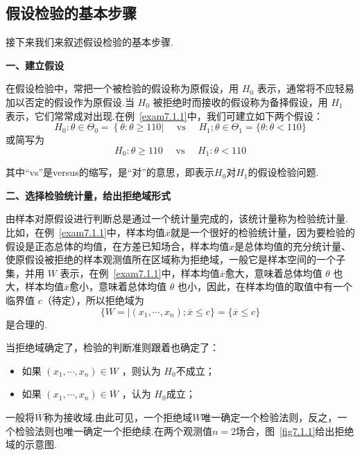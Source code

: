 \subsection{假设检验的基本步骤\label{7.1.2}}
接下来我们来叙述假设检验的基本步骤.

\textbf{一、建立假设}

在假设检验中，常把一个被检验的假设称为原假设，用 $H_{0}$ 表示，通常将不应轻易加以否定的假设作为原假设.当 $H_{0}$ 被拒绝时而接收的假设称为备择假设，用 $H_{1}$ 表示，它们常常成对出现.在例~\ref{exam7.1.1}中，我们可建立如下两个假设：
\[H _ { 0 } : \theta \in \Theta _ { 0 } = \left\{ \theta : \theta \geq 110 | \quad \text { vs } \quad H _ { 1 } ; \theta \in \Theta _ { 1 } = \{ \theta : \theta < 110 \}\right.\]
或简写为
\[H _ { 0 } : \theta \geq 110 \quad \text { vs } \quad H _ { 1 } : \theta < 110\]

其中“vs”是versus的缩写，是“对”的意思，即表示$H_{0}$对$H_{1}$的假设检验问题.

\textbf{二、选择检验统计量，给出拒绝域形式}

由样本对原假设进行判断总是通过一个统计量完成的，该统计量称为检验统计量.比如，在例~\ref{exam7.1.1}中，样本均值$\overline{x}$就是一个很好的检验统计量，因为要检验的假设是正态总体的均值，在方差已知场合，样本均值$x$是总体均值的充分统计量、使原假设被拒绝的样本观测值所在区域称为拒绝域，一般它是样本空间的一个子集，并用 $W$ 表示，在例~\ref{exam7.1.1}中，样本均值$\overline{x}$愈大，意味着总体均值 $\theta$ 也大，样本均值$\overline{x}$愈小，意味着总体均值 $\theta$ 也小，因此，在样本均值的取值中有一个临界值 $c$（待定），所以拒绝域为
\[\{W = | \left( x _ { 1 } , \cdots , x _ { n } \right) ; \overline { x } \leq c \} = \{ \overline { x } \leq c \}\]
是合理的.

当拒绝域确定了，检验的判断准则跟着也确定了：
\begin{itemize}
	\item 如果 $\left( x _ { 1 } , \cdots , x _ { n } \right) \in W$ ，则认为 $H_{0}$不成立；
	\item 如果 $\left( x _ { 1 } , \cdots , x _ { n } \right) \in \overline { W }$ ，认为 $H_{0}$成立；
\end{itemize}

一般将$\overline{W}$称为接收域.由此可见，一个拒绝域$W$唯一确定一个检验法则，反之，一个检验法则也唯一确定一个拒绝续.在两个观测值$n=2$场合，图~\ref{fig7.1.1}给出拒绝域的示意图.

